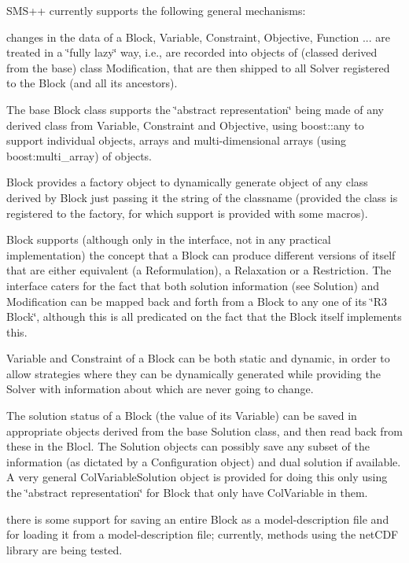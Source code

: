 S\+M\+S++ currently supports the following general mechanisms\+:


\begin{DoxyItemize}
\item changes in the data of a Block, Variable, Constraint, Objective, Function ... are treated in a \char`\"{}fully lazy\char`\"{} way, i.\+e., are recorded into objects of (classed derived from the base) class Modification, that are then shipped to all Solver registered to the Block (and all its ancestors).
\item The base Block class supports the \char`\"{}abstract representation\char`\"{} being made of any derived class from Variable, Constraint and Objective, using boost\+::any to support individual objects, arrays and multi-\/dimensional arrays (using boost\+:multi\+\_\+array) of objects.
\item Block provides a factory object to dynamically generate object of any class derived by Block just passing it the string of the classname (provided the class is registered to the factory, for which support is provided with some macros).
\item Block supports (although only in the interface, not in any practical implementation) the concept that a Block can produce different versions of itself that are either equivalent (a Reformulation), a Relaxation or a Restriction. The interface caters for the fact that both solution information (see Solution) and Modification can be mapped back and forth from a Block to any one of its \char`\"{}\+R3 Block\char`\"{}, although this is all predicated on the fact that the Block itself implements this.
\item Variable and Constraint of a Block can be both static and dynamic, in order to allow strategies where they can be dynamically generated while providing the Solver with information about which are never going to change.
\item The solution status of a Block (the value of its Variable) can be saved in appropriate objects derived from the base Solution class, and then read back from these in the Blocl. The Solution objects can possibly save any subset of the information (as dictated by a Configuration object) and dual solution if available. A very general Col\+Variable\+Solution object is provided for doing this only using the \char`\"{}abstract representation\char`\"{} for Block that only have Col\+Variable in them.
\item there is some support for saving an entire Block as a model-\/description file and for loading it from a model-\/description file; currently, methods using the net\+C\+DF library are being tested.
\end{DoxyItemize}

